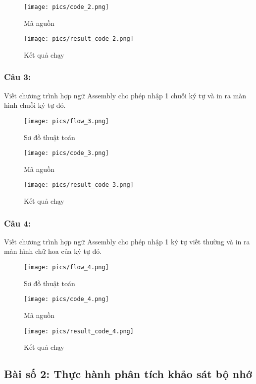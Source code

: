 \documentclass[12pt]{article}
\begin{document}
\begin{figure}[H]
  \centering
  \texttt{[image: pics/code\_2.png]}
  \caption{Mã nguồn}
  \label{fig:code_2}
\end{figure}

\begin{figure}[H]
  \centering
  \texttt{[image: pics/result\_code\_2.png]}
  \caption{Kết quả chạy}
  \label{fig:result_code_2}
\end{figure}
\cleardoublepage
\subsubsection{Câu 3:}
Viết chương trình hợp ngữ Assembly cho phép nhập 1 chuỗi ký tự và in ra màn hình chuỗi ký tự đó.
\begin{figure}[H]
  \centering
  \texttt{[image: pics/flow\_3.png]}
  \caption{Sơ đồ thuật toán}
  \label{fig:flow_3}
\end{figure}
\begin{figure}[H]
  \centering
  \texttt{[image: pics/code\_3.png]}
  \caption{Mã nguồn}
  \label{fig:code_3}
\end{figure}

\begin{figure}[H]
  \centering
  \texttt{[image: pics/result\_code\_3.png]}
  \caption{Kết quả chạy}
  \label{fig:result_code_3}
\end{figure}

\subsubsection{Câu 4:}
Viết chương trình hợp ngữ Assembly cho phép nhập 1 ký tự viết thường và in ra màn hình chữ hoa của ký tự đó.
\begin{figure}[H]
  \centering
  \texttt{[image: pics/flow\_4.png]}
  \caption{Sơ đồ thuật toán}
  \label{fig:flow_4}
\end{figure}
\begin{figure}[H]
  \centering
  \texttt{[image: pics/code\_4.png]}
  \caption{Mã nguồn}
  \label{fig:code_4}
\end{figure}
\begin{figure}[H]
  \centering
  \texttt{[image: pics/result\_code\_4.png]}
  \caption{Kết quả chạy}
  \label{fig:result_code_4}
\end{figure}
\subsection{Bài số 2: Thực hành phân tích khảo sát bộ nhớ}
\end{document}
